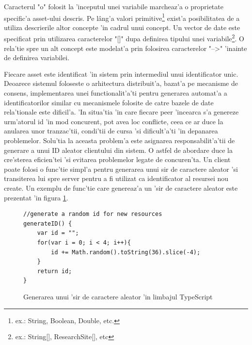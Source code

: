 \documentclass[12pt,a4paper,twoside]{report}
\begin{document}
  Caracterul "o" folosit la 'inceputul unei variabile marcheaz'a o proprietate specific'a asset-ului descris. Pe l\^ang'a valori primitive\footnote{ex.: String, Boolean, Double, etc.} exist'a posibilitatea de a utiliza descrierile altor concepte 'in cadrul unui concept. Un vector de date este specificat prin utilizarea caracterelor "[]" dupa definirea tipului unei variabile\footnote{ex.: String[], ResearchSite[], etc}. O rela'tie spre un alt concept este modelat'a prin folosirea caracterelor "-->" 'inainte de definirea variabilei. 
  
  Fiecare asset este identificat 'in sistem prin intermediul unui identificator unic. Deoarece sistemul foloseste o arhitectura distribuit'a, bazat'a pe mecanisme de consens, implementarea unei functionalit'a'ti pentru generarea automat'a a identificatorilor similar cu mecanismele folosite de catre bazele de date rela'tionale este dificil'a. 'In situa'tia 'in care fiecare peer 'incearca s'a genereze urm'atorul id 'in mod concurent, pot avea loc conflicte, ceea ce ar duce la anularea unor tranzac'tii, condi'tii de cursa 'si dificult'a'ti 'in depanarea problemelor. Solu'tia la aceasta problem'a este asignarea responsabilit'a'tii de generare a unui ID aleator clientului din sistem. O astfel de abordare duce la cre'sterea eficien'tei 'si evitarea problemelor legate de concuren'ta. Un client poate folosi o func'tie simpl'a pentru generarea unui sir de caractere aleator 'si transiterea lui spre server pentru a fi utilizat ca identificator al resursei nou create. Un exemplu de func'tie care genereaz'a un 'sir de caractere aleator este prezentat 'in figura \ref{fig:rand}.
  
      	\begin{figure}[H]
		\begin{center}
				\begin{lstlisting}[style=htmlcssjs]
//generate a random id for new resources
generateID() {
    var id = "";
    for(var i = 0; i < 4; i++){
        id += Math.random().toString(36).slice(-4);
    }
    return id;
}
			\end{lstlisting}
			\caption{Generarea unui 'sir de caractere aleator 'in limbajul TypeScript}
  			\label{fig:rand}
  		\end{center}
  		\end{figure}
\end{document}
